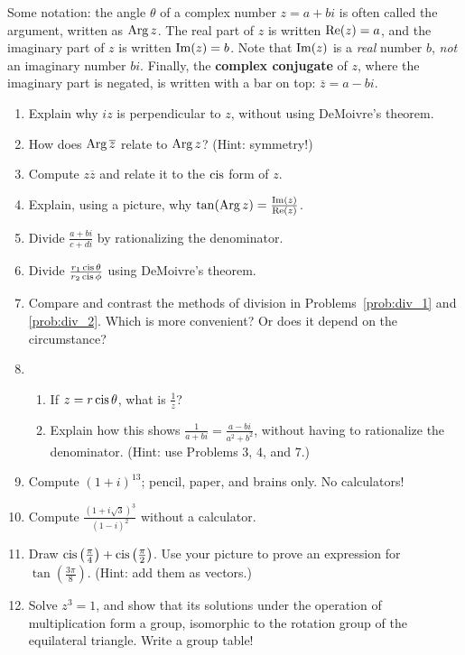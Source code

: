 \documentclass[../textbook.tex]{subfiles}
\begin{document}
Some notation: the angle $\theta$ of a complex number $z = a+bi$ is often called the argument, written as $\operatorname{Arg} z$. The real part of $z$ is written $\operatorname{Re} (z) = a$, and the imaginary part of $z$ is written $\operatorname{Im} (z) = b$. Note that $\operatorname{Im} (z)$ is a \textit{real} number $b$, \textit{not} an imaginary number $bi$. Finally, the \textbf{complex conjugate} of $z$, where the imaginary part is negated, is written with a bar on top: $\overline{z} = a-bi$.

\begin{enumerate}
\item Explain why $iz$ is perpendicular to $z$, without using DeMoivre's theorem.
\item How does $\operatorname{Arg} \overline{z}$ relate to $\operatorname{Arg} z$? (Hint: symmetry!)
\item Compute $z\overline{z}$ and relate it to the $\operatorname{cis}$ form of $z$.
\item Explain, using a picture, why $\tan (\operatorname{Arg} z) = \frac{\operatorname{Im}(z)}{\operatorname{Re}(z)}$.
\item Divide $\frac{a+bi}{c+di}$ by rationalizing the denominator.~\label{prob:div_1}
\item Divide $\frac{r_1\operatorname{cis} \theta}{r_2\operatorname{cis} \phi}$ using DeMoivre's theorem.~\label{prob:div_2}
\item Compare and contrast the methods of division in Problems~\ref{prob:div_1} and \ref{prob:div_2}. Which is more convenient? Or does it depend on the circumstance?
\item \begin{enumerate}
\item If $z = r\operatorname{cis} \theta$, what is $\frac{1}{z}$?
\item Explain how this shows $\frac{1}{a+bi}=\frac{a-bi}{a^2+b^2}$, without having to rationalize the denominator. (Hint: use Problems 3, 4, and 7.)
\end{enumerate}
\item Compute $(1+i)^{13}$; pencil, paper, and brains only. No calculators!
\item Compute $\frac{(1+i\sqrt{3})^3}{(1-i)^2}$ without a calculator.
\item Draw $\operatorname{cis}\left(\frac{\pi}{4}\right) + \operatorname{cis}\left(\frac{\pi}{2}\right)$. Use your picture to prove an expression for $\tan\left(\frac{3\pi}{8}\right)$. (Hint: add them as vectors.)
\item Solve $z^3 = 1$, and show that its solutions under the operation of multiplication form a group, isomorphic to the rotation group of the equilateral triangle. Write a group table!

\end{enumerate}
\end{document}
